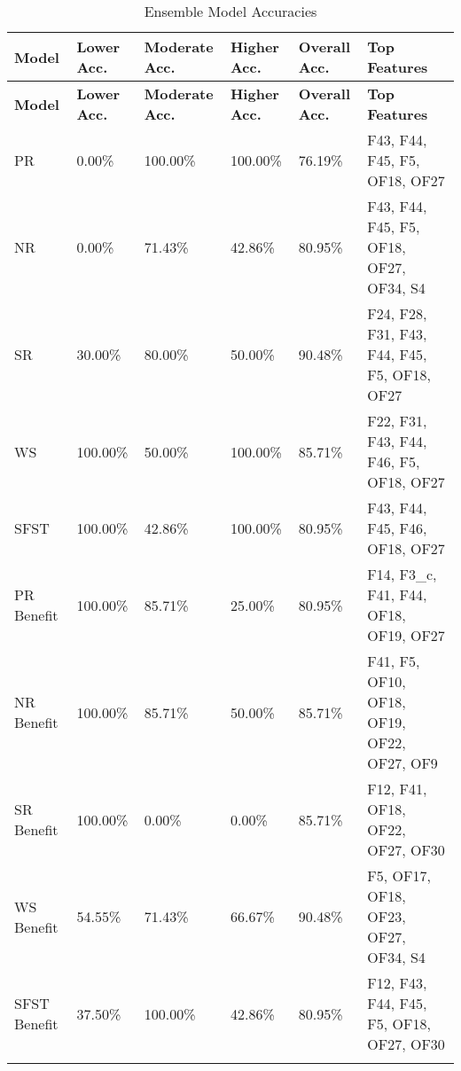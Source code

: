 \begin{longtable}{|p{1.5cm}|p{2.0cm}|p{2.0cm}|p{2.0cm}|p{2.0cm}|p{4cm}|}
\hline
\textbf{Model} & \textbf{Lower Acc.} & \textbf{Moderate Acc.} & \textbf{Higher Acc.} & \textbf{Overall Acc.} & \textbf{Top Features} \\ \hline
\endfirsthead
\hline
\textbf{Model} & \textbf{Lower Acc.} & \textbf{Moderate Acc.} & \textbf{Higher Acc.} & \textbf{Overall Acc.} & \textbf{Top Features} \\ \hline
\endhead


PR & 0.00\% & 100.00\% & 100.00\% & 76.19\% & F43, F44, F45, F5, OF18, OF27 \\ \hline
NR & 0.00\% & 71.43\% & 42.86\% & 80.95\% & F43, F44, F45, F5, OF18, OF27, OF34, S4 \\ \hline
SR & 30.00\% & 80.00\% & 50.00\% & 90.48\% & F24, F28, F31, F43, F44, F45, F5, OF18, OF27 \\ \hline
WS & 100.00\% & 50.00\% & 100.00\% & 85.71\% & F22, F31, F43, F44, F46, F5, OF18, OF27 \\ \hline
SFST & 100.00\% & 42.86\% & 100.00\% & 80.95\% & F43, F44, F45, F46, OF18, OF27 \\ \hline

PR Benefit & 100.00\% & 85.71\% & 25.00\% & 80.95\% & F14, F3\_c, F41, F44, OF18, OF19, OF27 \\ \hline
NR Benefit & 100.00\% & 85.71\% & 50.00\% & 85.71\% & F41, F5, OF10, OF18, OF19, OF22, OF27, OF9 \\ \hline
SR Benefit & 100.00\% & 0.00\% & 0.00\% & 85.71\% & F12, F41, OF18, OF22, OF27, OF30 \\ \hline
WS Benefit & 54.55\% & 71.43\% & 66.67\% & 90.48\% & F5, OF17, OF18, OF23, OF27, OF34, S4 \\ \hline
SFST Benefit & 37.50\% & 100.00\% & 42.86\% & 80.95\% & F12, F43, F44, F45, F5, OF18, OF27, OF30 \\ \hline
\caption{Ensemble Model Accuracies}
\label{tab:grouping_2b}
\end{longtable}



